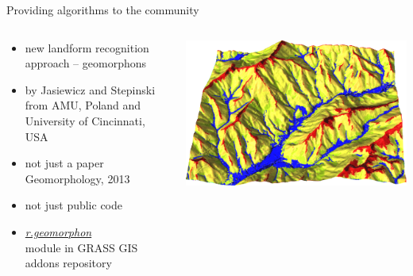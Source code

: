 \documentclass[xcolor={dvipsnames,usenames},beamer,aspectratio=43]{beamer}
\newcommand{\amodule}[1]{\href{http://grass.osgeo.org/grass70/manuals/addons/#1.html}{\emph{#1}}}
\begin{document}
\begin{frame}{Providing algorithms to the community}

\begin{columns}
\begin{column}{0.4\textwidth}


\begin{itemize}
  \item new landform recognition approach -- geomorphons
  \item by Jasiewicz and Stepinski from AMU, Poland and University of Cincinnati, USA
  \item not just a paper
    {\tiny Geomorphology, 2013}
  \item not just public code
  \item \amodule{r.geomorphon}
    \\{\tiny module in GRASS GIS addons repository}
\end{itemize}

\end{column}
\begin{column}{0.58\textwidth}

\begin{center}
  \includegraphics[width=\textwidth]{vis/geomorphon_3d}
\end{center}

\end{column}
\end{columns}

\end{frame}
\end{document}
